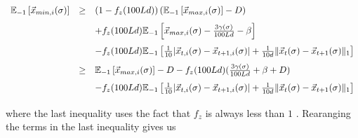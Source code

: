\documentclass[]{article}
\newcommand{\Eover}[2]{\mathbb{E}_{#1}\left[#2\right]}
\newcommand{\x}{\vec{x}}
\theoremstyle{definition}
\begin{document}
\begin{equation*}
    \begin{array}{lll}
         \Eover{-1}{\x_{min,i}(\sigma)} &\geq&   \left(1-f_z(100Ld)\right)(\Eover{-1}{\x_{max, i}(\sigma)}-D)\vspace{0.1in}\\
         && + f_z(100Ld)\Eover{-1}{\x_{max,i}(\sigma) - \frac{3\gamma(\sigma)}{100Ld} - \beta}\vspace{0.1in}\\
         && - f_z(100Ld)\Eover{-1}{\frac{1}{10}|\x_{t,i}(\sigma) - \x_{t+1,i}(\sigma)|+\frac{1}{10d}\|\x_{t}(\sigma) - \x_{t+1}(\sigma)\|_1}\vspace{0.1in}\\


         & \geq & \Eover{-1}{\x_{max, i}(\sigma)} - D - f_z(100Ld)( \frac{3\gamma(\sigma)}{100Ld} + \beta + D)\vspace{0.1in}\\
         && - f_z(100Ld)\Eover{-1}{\frac{1}{10}|\x_{t,i}(\sigma) - \x_{t+1,i}(\sigma)|+\frac{1}{10d}\|\x_{t}(\sigma) - \x_{t+1}(\sigma)\|_1}\vspace{0.1in}\\


    \end{array}
\end{equation*}
where the last inequality uses the fact that $f_z$ is always less than $1$ . Rearanging the terms in the last inequality gives us 
\end{document}
